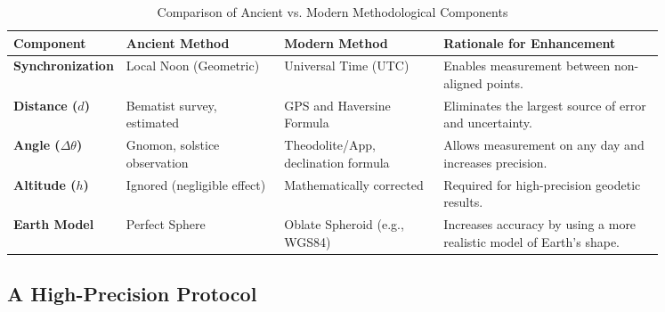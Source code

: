 \documentclass[11pt]{article}
\begin{document}
\begin{table}[htbp]
\centering
\caption{Comparison of Ancient vs. Modern Methodological Components}
\label{tab:ancient_vs_modern}
\small
\begin{tabular}{@{}lp{0.25\linewidth}p{0.25\linewidth}p{0.35\linewidth}@{}}
\toprule
\textbf{Component} & \textbf{Ancient Method} & \textbf{Modern Method} & \textbf{Rationale for Enhancement} \\
\midrule
\textbf{Synchronization} & Local Noon (Geometric) & Universal Time (UTC) & Enables measurement between non-aligned points. \\
\addlinespace
\textbf{Distance ($d$)} & Bematist survey, estimated & GPS and Haversine Formula & Eliminates the largest source of error and uncertainty. \\
\addlinespace
\textbf{Angle ($\Delta\theta$)} & Gnomon, solstice observation & Theodolite/App, declination formula & Allows measurement on any day and increases precision. \\
\addlinespace
\textbf{Altitude ($h$)} & Ignored (negligible effect) & Mathematically corrected & Required for high-precision geodetic results. \\
\addlinespace
\textbf{Earth Model} & Perfect Sphere & Oblate Spheroid (e.g., WGS84) & Increases accuracy by using a more realistic model of Earth's shape. \\
\bottomrule
\end{tabular}
\end{table}

\subsection{A High-Precision Protocol}
\end{document}
